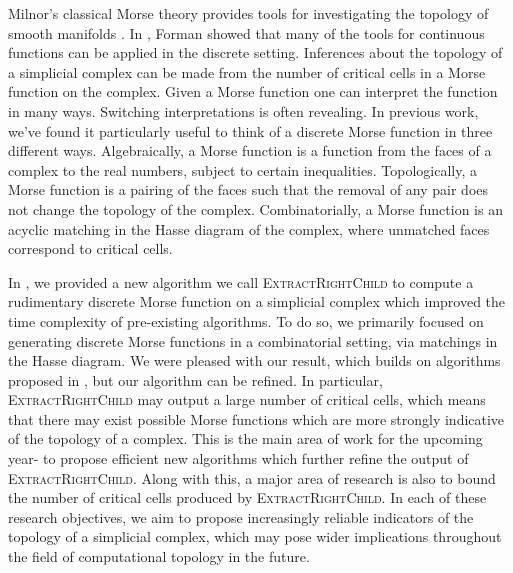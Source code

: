 \documentclass[11pt]{article}
\begin{document}
Milnor’s classical Morse theory provides tools for investigating 
the topology of smooth manifolds \cite{milnor63}. 
In \cite{forman98},
Forman showed that many of the tools for continuous
functions can be applied in the discrete setting. Inferences 
about the topology of a simplicial complex can be made
from the number of critical cells in a Morse function on
the complex.
Given a Morse function one can interpret the function 
in many ways. Switching interpretations is often
revealing. In previous work, we've found it particularly useful
to think of a discrete Morse
function in three different ways. Algebraically, a Morse
function is a function from the faces of a complex to the
real numbers, subject to certain inequalities. Topologically, 
a Morse function is a pairing of the faces such that
the removal of any pair does not change the topology of
the complex. Combinatorially, a Morse function is an
acyclic matching in the Hasse diagram of the complex,
where unmatched faces correspond to critical cells.

In \cite{us}, we provided a new algorithm we call \textsc{ExtractRightChild} to compute
a rudimentary discrete Morse function on a simplicial
complex which improved the time complexity of pre-existing
algorithms. To do so, we primarily focused on generating
discrete Morse functions in a combinatorial setting,
via matchings in the Hasse diagram. We were pleased with our result,
which builds on algorithms proposed in \cite{king},
but our algorithm can be refined. In particular, 
\textsc{ExtractRightChild} may output a large number of critical
cells, which means that there may exist possible Morse functions
which are more strongly indicative of the topology of a complex.
This is the main area of work for the upcoming year- to 
propose efficient new algorithms which further refine the output of 
\textsc{ExtractRightChild}. Along with this, a major area of
research is also to bound the number of critical cells produced
by \textsc{ExtractRightChild}. In each of these research objectives, 
we aim to propose increasingly
reliable indicators of the topology of a simplicial complex, which may 
pose wider implications throughout the field of computational topology in the 
future.
\end{document}
